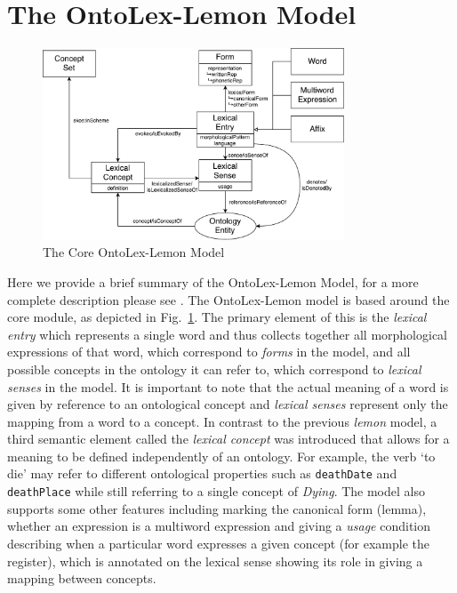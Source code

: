 \documentclass[12pt,a4paper]{elex2017}
\begin{document}
\section{The OntoLex-Lemon Model}

\begin{figure}
    \begin{center}
\includegraphics[width=0.8\textwidth]{LemonOntoLexCore.pdf}
    \end{center}
\caption{\label{fig:core}The Core OntoLex-Lemon Model}
\end{figure}

Here we provide a brief summary of the OntoLex-Lemon Model, for a more complete
description please see \cite{cimiano2016lexicon}.
The OntoLex-Lemon model is based around the core module, as depicted in
Fig.~\ref{fig:core}. The primary element of this is the \emph{lexical entry}
which represents a single word and thus collects together all morphological
expressions of that word, which correspond to \emph{forms} in the model, and all
possible concepts in the ontology it can refer to, which correspond to
\emph{lexical senses} in the model. It is important to note that the actual
meaning of a word is given by reference to an ontological concept and
\emph{lexical senses} represent only the mapping from a word to a concept. In
contrast to the previous \emph{lemon} model, a third semantic element called the
\emph{lexical concept} was introduced that allows for a meaning to be defined
independently of an ontology. For example, the verb `to die' may refer to
different ontological properties such as \texttt{deathDate} and \texttt{deathPlace} while
still referring to a single concept of \emph{Dying}. The model also supports
some other features including marking the canonical form (lemma), whether an
expression is a multiword expression and giving a \emph{usage} condition
describing when a particular word expresses a given concept (for example the
register), which is annotated on the lexical sense showing its role in giving a
mapping between concepts.
\end{document}
